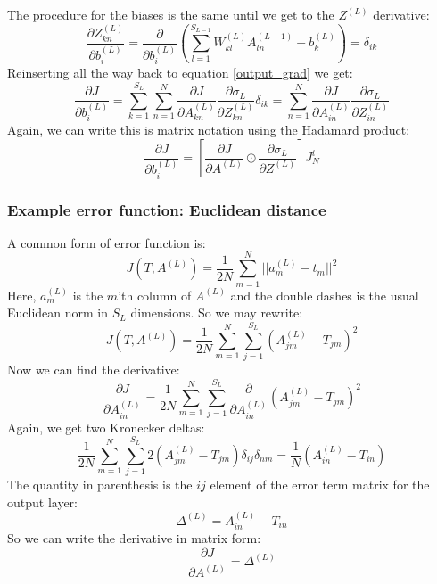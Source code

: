 \documentclass[12pt, a4paper]{article}
\numberwithin{equation}{section}
\begin{document}
The procedure for the biases is the same until we get to the $Z^{(L)}$ derivative:
\begin{equation}
\frac{\partial Z^{(L)}_{kn}}{\partial b^{(L)}_i}=\frac{\partial}{\partial b^{(L)}_i}\left(\sum_{l=1}^{S_{L-1}}W^{(L)}_{kl}A^{(L-1)}_{ln}+b^{(L)}_k\right)=\delta_{ik}
\end{equation}
Reinserting all the way back to equation \ref{output_grad} we get:
\begin{equation}
\frac{\partial J}{\partial b^{(L)}_i}=\sum_{k=1}^{S_L}\sum_{n=1}^N\frac{\partial J}{\partial A^{(L)}_{kn}}\frac{\partial\sigma_L}{\partial Z^{(L)}_{kn}}\delta_{ik}=\sum_{n=1}^N\frac{\partial J}{\partial A^{(L)}_{in}}\frac{\partial\sigma_L}{\partial Z^{(L)}_{in}}
\end{equation}
Again, we can write this is matrix notation using the Hadamard product:
\begin{equation}
\label{output_bias_matrix}
\frac{\partial J}{\partial b^{(L)}_i}=\left[\frac{\partial J}{\partial A^{(L)}}\odot\frac{\partial\sigma_L}{\partial Z^{(L)}}\right]J_N^t
\end{equation}

\subsubsection{Example error function: Euclidean distance}
A common form of error function is:
\begin{equation}
J(T,A^{(L)})=\frac{1}{2N}\sum_{m=1}^N||a^{(L)}_m-t_m||^2
\end{equation}
Here, $a^{(L)}_m$ is the $m$'th column of $A^{(L)}$ and the double dashes is the usual Euclidean norm in $S_L$ dimensions. So we may rewrite:
\begin{equation}
J(T,A^{(L)})=\frac{1}{2N}\sum_{m=1}^N\sum_{j=1}^{S_L}(A^{(L)}_{jm}-T_{jm})^2
\end{equation}
Now we can find the derivative:
\begin{equation}
\frac{\partial J}{\partial A^{(L)}_{in}}=\frac{1}{2N}\sum_{m=1}^N\sum_{j=1}^{S_L}\frac{\partial}{\partial A^{(L)}_{in}}(A^{(L)}_{jm}-T_{jm})^2
\end{equation}
Again, we get two Kronecker deltas:
\begin{equation}
\frac{1}{2N}\sum_{m=1}^N\sum_{j=1}^{S_L}2(A^{(L)}_{jm}-T_{jm})\delta_{ij}\delta_{nm}=\frac{1}{N}(A^{(L)}_{in}-T_{in})
\end{equation}
The quantity in parenthesis is the $ij$ element of the error term matrix for the output layer:
\begin{equation}
\Delta^{(L)}=A^{(L)}_{in}-T_{in}
\end{equation}
So we can write the derivative in matrix form:
\begin{equation}
\frac{\partial J}{\partial A^{(L)}}=\Delta^{(L)}
\end{equation}
\end{document}
